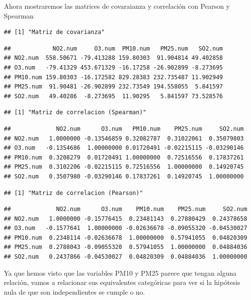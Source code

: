 \documentclass[notspecified,article,submit,moreauthors,pdftex]{Definitions/mdpi}
\begin{document}
Ahora mostraremos las matrices de covaraianza y correlación con Pearson
y Spearman

\begin{verbatim}
## [1] "Matriz de covarianza"
\end{verbatim}

\begin{verbatim}
##            NO2.num     O3.num  PM10.num   PM25.num   SO2.num
## NO2.num  558.50671 -79.413288 159.80303  91.904814 49.402858
## O3.num   -79.41329 453.671329 -16.17258 -26.902899 -8.273695
## PM10.num 159.80303 -16.172582 829.28383 232.735487 11.902949
## PM25.num  91.90481 -26.902899 232.73549 194.558055  5.841597
## SO2.num   49.40286  -8.273695  11.90295   5.841597 73.528576
\end{verbatim}

\begin{verbatim}
## [1] "Matriz de correlacion (Spearman)"
\end{verbatim}

\begin{verbatim}
##             NO2.num      O3.num   PM10.num    PM25.num     SO2.num
## NO2.num   1.0000000 -0.13546859 0.32082787  0.31022061  0.35079803
## O3.num   -0.1354686  1.00000000 0.01720491 -0.02215115 -0.03290146
## PM10.num  0.3208279  0.01720491 1.00000000  0.72516556  0.17837261
## PM25.num  0.3102206 -0.02215115 0.72516556  1.00000000  0.14920745
## SO2.num   0.3507980 -0.03290146 0.17837261  0.14920745  1.00000000
\end{verbatim}

\begin{verbatim}
## [1] "Matriz de correlacion (Pearson)"
\end{verbatim}

\begin{verbatim}
##             NO2.num      O3.num    PM10.num    PM25.num     SO2.num
## NO2.num   1.0000000 -0.15776415  0.23481143  0.27880429  0.24378658
## O3.num   -0.1577641  1.00000000 -0.02636678 -0.09055320 -0.04530027
## PM10.num  0.2348114 -0.02636678  1.00000000  0.57941055  0.04820309
## PM25.num  0.2788043 -0.09055320  0.57941055  1.00000000  0.04884036
## SO2.num   0.2437866 -0.04530027  0.04820309  0.04884036  1.00000000
\end{verbatim}

Ya que hemos visto que las variables PM10 y PM25 parece que tengan
alguna relación, vamos a relacionar sus equivalentes categóricas para
ver si la hipótesis nula de que son independientes se cumple o no.
\end{document}
